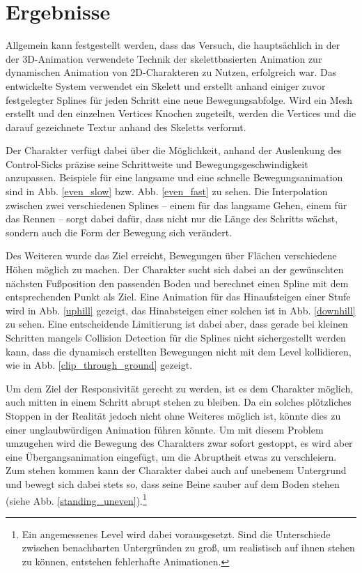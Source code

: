 \chapter{Ergebnisse}
Allgemein kann festgestellt werden, dass das Versuch, die hauptsächlich in der der 3D-Animation verwendete Technik der skelettbasierten Animation zur dynamischen Animation von 2D-Charakteren zu Nutzen, erfolgreich war. Das entwickelte System verwendet ein Skelett und erstellt anhand einiger zuvor festgelegter Splines für jeden Schritt eine neue Bewegungsabfolge. Wird ein Mesh erstellt und den einzelnen Vertices Knochen zugeteilt, werden die Vertices und die darauf gezeichnete Textur anhand des Skeletts verformt.

Der Charakter verfügt dabei über die Möglichkeit, anhand der Auslenkung des Control-Sicks präzise seine Schrittweite und Bewegungsgeschwindigkeit anzupassen. Beispiele für eine langsame und eine schnelle Bewegungsanimation sind in Abb. \ref{even_slow} bzw. Abb. \ref{even_fast} zu sehen. Die Interpolation zwischen zwei verschiedenen Splines -- einem für das langsame Gehen, einem für das Rennen -- sorgt dabei dafür, dass nicht nur die Länge des Schritts wächst, sondern auch die Form der Bewegung sich verändert.

Des Weiteren wurde das Ziel erreicht, Bewegungen über Flächen verschiedene Höhen möglich zu machen. Der Charakter sucht sich dabei an der gewünschten nächsten Fußposition den passenden Boden und berechnet einen Spline mit dem entsprechenden Punkt als Ziel. Eine Animation für das Hinaufsteigen einer Stufe wird in Abb. \ref{uphill} gezeigt, das Hinabsteigen einer solchen ist in Abb. \ref{downhill} zu sehen. Eine entscheidende Limitierung ist dabei aber, dass gerade bei kleinen Schritten mangels Collision Detection für die Splines nicht sichergestellt werden kann, dass die dynamisch erstellten Bewegungen nicht mit dem Level kollidieren, wie in Abb. \ref{clip_through_ground} gezeigt.

Um dem Ziel der Responsivität gerecht zu werden, ist es dem Charakter möglich, auch mitten in einem Schritt abrupt stehen zu bleiben. Da ein solches plötzliches Stoppen in der Realität jedoch nicht ohne Weiteres möglich ist, könnte dies zu einer unglaubwürdigen Animation führen könnte. Um mit diesem Problem umzugehen wird die Bewegung des Charakters zwar sofort gestoppt, es wird aber eine Übergangsanimation eingefügt, um die Abruptheit etwas zu verschleiern. Zum stehen kommen kann der Charakter dabei auch auf unebenem Untergrund und bewegt sich dabei stets so, dass seine Beine sauber auf dem Boden stehen (siehe Abb. \ref{standing_uneven}).\footnote{Ein angemessenes Level wird dabei vorausgesetzt. Sind die Unterschiede zwischen benachbarten Untergründen zu groß, um realistisch auf ihnen stehen zu können, entstehen fehlerhafte Animationen.}

